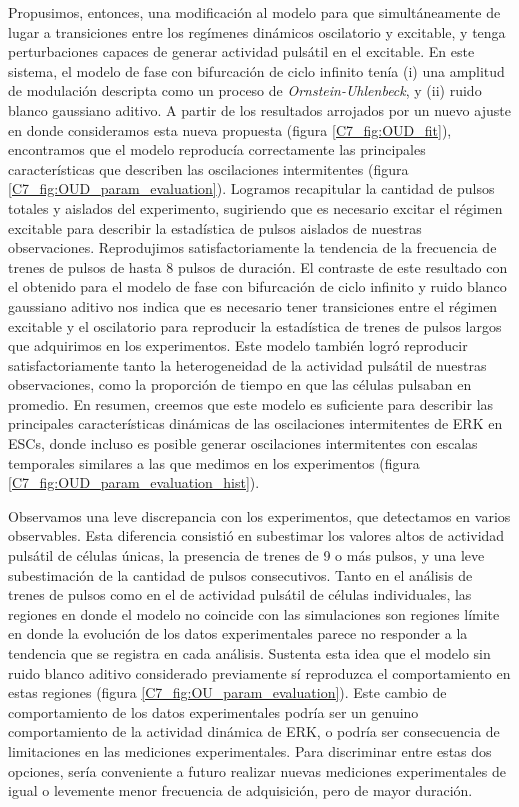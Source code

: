 \documentclass[./main.tex]{subfiles}
\begin{document}
Propusimos, entonces, una modificación al modelo para que simultáneamente de lugar a transiciones entre los regímenes dinámicos oscilatorio y excitable, y tenga perturbaciones capaces de generar actividad pulsátil en el excitable. En este sistema, el modelo de fase con bifurcación de ciclo infinito tenía (i) una amplitud de modulación descripta como un proceso de \textit{Ornstein-Uhlenbeck}, y (ii) ruido blanco gaussiano aditivo.  A partir de los resultados arrojados por un nuevo ajuste en donde consideramos esta nueva propuesta (figura \ref{C7_fig:OUD_fit}), encontramos que el modelo reproducía correctamente las principales características que describen las oscilaciones intermitentes (figura \ref{C7_fig:OUD_param_evaluation}). Logramos recapitular la cantidad de pulsos totales y aislados del experimento, sugiriendo que es necesario excitar el régimen excitable para describir la estadística de pulsos aislados de nuestras observaciones. Reprodujimos satisfactoriamente la tendencia de la frecuencia de trenes de pulsos de hasta 8 pulsos de duración. El contraste de este resultado con el obtenido para el modelo de fase con bifurcación de ciclo infinito y ruido blanco gaussiano aditivo nos indica que es necesario tener transiciones entre el régimen excitable y el oscilatorio para reproducir la estadística de trenes de pulsos largos que adquirimos en los experimentos. Este modelo también logró reproducir satisfactoriamente tanto la heterogeneidad de la actividad pulsátil de nuestras observaciones, como la proporción de tiempo en que las células pulsaban en promedio. En resumen, creemos que este modelo es suficiente para describir las principales características dinámicas de las oscilaciones intermitentes de ERK en ESCs, donde incluso es posible generar oscilaciones intermitentes con escalas temporales similares a las que medimos en los experimentos (figura \ref{C7_fig:OUD_param_evaluation_hist}). 


Observamos una leve discrepancia con los experimentos, que detectamos en varios observables. Esta diferencia consistió en subestimar los valores altos de actividad pulsátil de células únicas, la presencia de trenes de 9 o más pulsos, y una leve subestimación de la cantidad de pulsos consecutivos. Tanto en el análisis de trenes de pulsos como en el de actividad pulsátil de células individuales, las regiones en donde el modelo no coincide con las simulaciones son regiones límite en donde la evolución de los datos experimentales parece no responder a la tendencia que se registra en cada análisis. Sustenta esta idea que el modelo sin ruido blanco aditivo considerado previamente sí reproduzca el comportamiento en estas regiones (figura \ref{C7_fig:OU_param_evaluation}). Este cambio de comportamiento de los datos experimentales podría ser un genuino comportamiento de la actividad dinámica de ERK, o podría ser consecuencia de limitaciones en las mediciones experimentales. Para discriminar entre estas dos opciones, sería conveniente a futuro realizar nuevas mediciones experimentales de igual o levemente menor frecuencia de adquisición, pero de mayor duración. 
\end{document}
